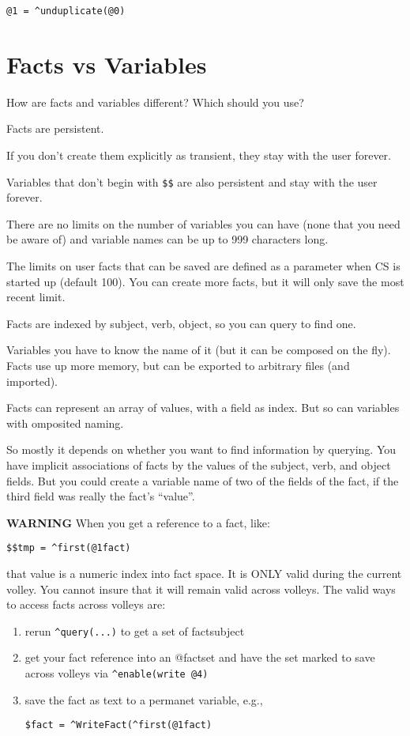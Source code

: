 \documentclass[]{article}
\begin{document}
\begin{verbatim}
@1 = ^unduplicate(@0)
\end{verbatim}

\section{Facts vs Variables}\label{facts-vs-variables}

How are facts and variables different? Which should you use?

Facts are persistent.

If you don't create them explicitly as transient, they stay with the
user forever.

Variables that don't begin with \texttt{\$\$} are also persistent and
stay with the user forever.

There are no limits on the number of variables you can have (none that
you need be aware of) and variable names can be up to 999 characters
long.

The limits on user facts that can be saved are defined as a parameter
when CS is started up (default 100). You can create more facts, but it
will only save the most recent limit.

Facts are indexed by subject, verb, object, so you can query to find
one.

Variables you have to know the name of it (but it can be composed on the
fly). Facts use up more memory, but can be exported to arbitrary files
(and imported).

Facts can represent an array of values, with a field as index. But so
can variables with omposited naming.

So mostly it depends on whether you want to find information by
querying. You have implicit associations of facts by the values of the
subject, verb, and object fields. But you could create a variable name
of two of the fields of the fact, if the third field was really the
fact's ``value''.

\textbf{WARNING} When you get a reference to a fact, like:

\begin{verbatim}
$$tmp = ^first(@1fact)
\end{verbatim}

that value is a numeric index into fact space. It is ONLY valid during
the current volley. You cannot insure that it will remain valid across
volleys. The valid ways to access facts across volleys are:

\begin{enumerate}
\def\labelenumi{\arabic{enumi}.}
\item
  rerun \texttt{\^{}query(...)} to get a set of factsubject
\item
  get your fact reference into an @factset and have the set marked to
  save across volleys via \texttt{\^{}enable(write\ @4)}
\item
  save the fact as text to a permanet variable, e.g.,

\begin{verbatim}
$fact = ^WriteFact(^first(@1fact)
\end{verbatim}
\end{enumerate}
\end{document}
